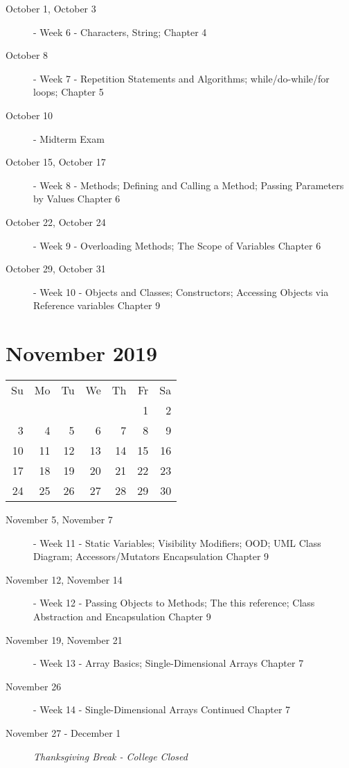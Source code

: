 \documentclass{article}
\begin{document}
\begin{description}
    \item[October 1, October 3] - Week 6 - Characters, String;
        \newline Chapter 4
    \item[October 8] - Week 7 - Repetition Statements and
        Algorithms; while/do-while/for loops;
        \newline Chapter 5
    \item[October 10] - Midterm Exam
    \item[October 15, October 17] - Week 8 - Methods; Defining and
        Calling a Method; Passing Parameters by Values
        \newline Chapter 6
    \item[October 22, October 24] - Week 9 - Overloading Methods; The
        Scope of Variables
        \newline Chapter 6
    \item[October 29, October 31] - Week 10 - Objects and Classes;
        Constructors; Accessing Objects via Reference variables
        \newline Chapter 9
\end{description}

\hrulefill

\section*{November 2019}
\begin{tabular}{rrrrrrr}
Su & Mo & Tu & We & Th & Fr & Sa\\
   &    &    &    &    &  1 &  2\\
 3 &  4 &  5 &  6 &  7 &  8 &  9\\
10 & 11 & 12 & 13 & 14 & 15 & 16\\
17 & 18 & 19 & 20 & 21 & 22 & 23\\
24 & 25 & 26 & 27 & 28 & 29 & 30\\
\end{tabular}

\begin{description}
    \item[November 5, November 7] - Week 11 - Static Variables;
        Visibility Modifiers; OOD; UML Class Diagram; Accessors/Mutators
        Encapsulation
        \newline Chapter 9
    \item[November 12, November 14] - Week 12 - Passing Objects to
        Methods; The this reference; Class Abstraction and Encapsulation
        \newline Chapter 9
    \item[November 19, November 21] - Week 13 - Array Basics;
        Single-Dimensional Arrays
        \newline Chapter 7
    \item[November 26] - Week 14 - Single-Dimensional Arrays Continued
        \newline Chapter 7
    \item[November 27 - December 1] {\em Thanksgiving Break - College Closed}
\end{description}
\end{document}
